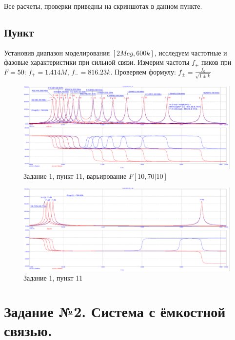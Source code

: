 \documentclass[a4paper, 14pt]{extarticle}%
\begin{document}
Все расчеты, проверки приведны на скриншотах в данном пункте.

\subsection{Пункт}

Установив диапазон моделирования $[2Meg, 600k]$, исследуем частотные и фазовые характеристики при сильной связи. 
\newline
Измерим частоты $f_{\pm}$ пиков при $F = 50$: $f_{+} = 1.414M$, $f_{-} = 816.23k$.
\newline
Проверяем формулу: $f_{\pm} = \frac{f_0}{\sqrt{1 \pm k}}$

\begin{figure}[h!]
	\centering
			\includegraphics[width=1.1\linewidth]{908_work/11_1.png}
            \caption{Задание 1,  пункт 11, варьирование $F  [10, 70|10]$}
	\label{A}
\end{figure}


\begin{figure}[h!]
	\centering
			\includegraphics[width=1.1\linewidth]{908_work/11_2.png}
            \caption{Задание 1,  пункт 11}
	\label{A}
\end{figure}

\newpage

\section{Задание №2. Система с ёмкостной связью.}
\end{document}
